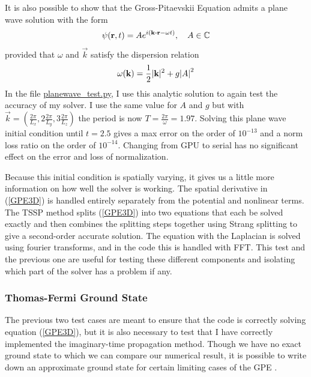 \documentclass[12]{article}
\begin{document}
It is also possible to show that the Gross-Pitaevskii Equation admits a plane wave solution with the form
\begin{equation}
\psi(\textbf{r},t) = Ae^{i(\textbf{k} \dotproduct \textbf{r} - \omega t)}, \quad A \in \mathbb{C}
\end{equation}
provided that $\omega$ and $\vec{k}$ satisfy the dispersion relation
\begin{equation}
\omega(\textbf{k}) = \frac{1}{2}|\textbf{k}|^2 + g \abs{A}^2
\end{equation}
In the file \href{https://github.com/TimSkaras/GPE-SpectralMethod/blob/master/Tests/homogeneous_test.py}{planewave\_test.py}, I use this analytic solution to again test the accuracy of my solver. I use the same value for $A$ and $g$ but with $\vec{k} = (\frac{2\pi}{L_x}, 2\frac{2\pi}{L_y},3\frac{2\pi}{L_z})$ the period is now $T = \frac{2\pi}{\omega} = 1.97$. Solving this plane wave initial condition until $t = 2.5$ gives a max error on the order of $10^{-13}$ and a norm loss ratio on the order of $10^{-14}$. Changing from GPU to serial has no significant effect on the error and loss of normalization.

Because this initial condition is spatially varying, it gives us a little more information on how well the solver is working. The spatial derivative in (\ref{GPE3D}) is handled entirely separately from the potential and nonlinear terms. The TSSP method splits (\ref{GPE3D}) into two equations that each be solved exactly and then combines the splitting steps together using Strang splitting to give a second-order accurate solution. The equation with the Laplacian is solved using fourier transforms, and in the code this is handled with FFT. This test and the previous one are useful for testing these different components and isolating which part of the solver has a problem if any.
 
\subsubsection{Thomas-Fermi Ground State}

The previous two test cases are meant to ensure that the code is correctly solving equation (\ref{GPE3D}), but it is also necessary to test that I have correctly implemented the imaginary-time propagation method. Though we have no exact ground state to which we can compare our numerical result, it is possible to write down an approximate ground state for certain limiting cases of the GPE \cite{bao2003numerical, bao2003ground}.
\end{document}
